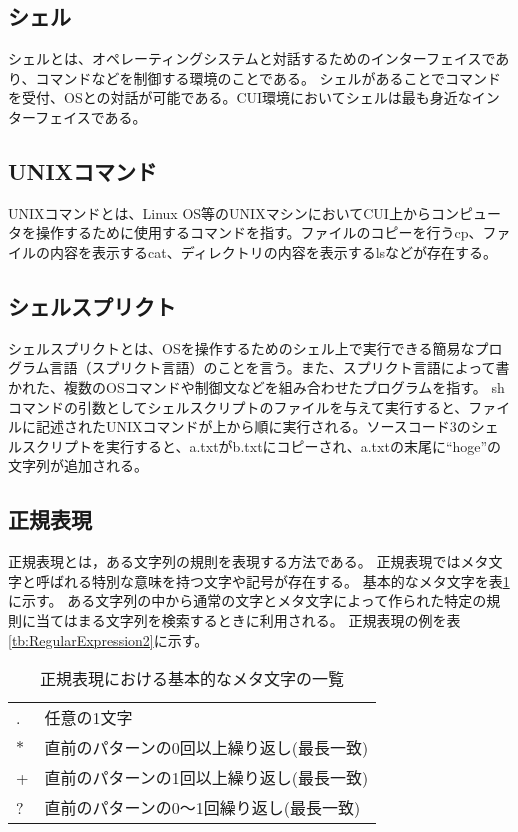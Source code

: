 \subsection{シェル}
シェルとは、オペレーティングシステムと対話するためのインターフェイスであり、コマンドなどを制御する環境のことである。
シェルがあることでコマンドを受付、OSとの対話が可能である。CUI環境においてシェルは最も身近なインターフェイスである。


\subsection{UNIXコマンド}
UNIXコマンドとは、Linux OS等のUNIXマシンにおいてCUI上からコンピュータを操作するために使用するコマンドを指す。ファイルのコピーを行うcp、ファイルの内容を表示するcat、ディレクトリの内容を表示するlsなどが存在する。


\subsection{シェルスプリクト}
シェルスプリクトとは、OSを操作するためのシェル上で実行できる簡易なプログラム言語（スプリクト言語）のことを言う。また、スプリクト言語によって書かれた、複数のOSコマンドや制御文などを組み合わせたプログラムを指す。
shコマンドの引数としてシェルスクリプトのファイルを与えて実行すると、ファイルに記述されたUNIXコマンドが上から順に実行される。ソースコード3のシェルスクリプトを実行すると、a.txtがb.txtにコピーされ、a.txtの末尾に“hoge”の文字列が追加される。



\subsection{正規表現}

正規表現とは，ある文字列の規則を表現する方法である。
正規表現ではメタ文字と呼ばれる特別な意味を持つ文字や記号が存在する。
基本的なメタ文字を表\ref{tb:RegularExpression}に示す。
ある文字列の中から通常の文字とメタ文字によって作られた特定の規則に当てはまる文字列を検索するときに利用される。
正規表現の例を表\ref{tb:RegularExpression2}に示す。

\begin{table}[t]
\begin{center}
\caption{正規表現における基本的なメタ文字の一覧}
\begin{tabular}{ll} \hline
. & 任意の1文字 \\
$\ast$ & 直前のパターンの0回以上繰り返し(最長一致) \\
+ & 直前のパターンの1回以上繰り返し(最長一致) \\
? & 直前のパターンの0～1回繰り返し(最長一致) \\ \hline
\end{tabular}
\label{tb:RegularExpression}
\end{center}
\end{table}

